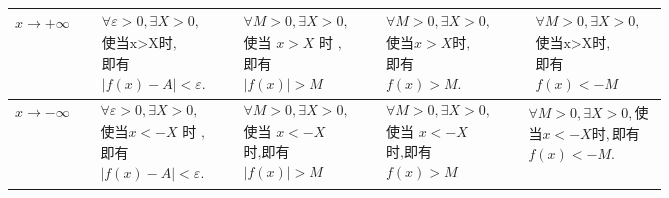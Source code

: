 \documentclass[12pt, a4paper, oneside, UTF8]{ctexbook}  %
\begin{document}
\begin{sloppypar}
\begin{center}
\begin{supertabular}{|c|c|c|c|c|}
            $x \to + \infty $ & $\begin{aligned}&\forall\varepsilon>0,\exists X>0, \\&\text{使当x>X时,} \\&\text{即有} \\&|f(x)-A|<\varepsilon.\end{aligned} $                                   & $\begin{aligned}&\forall M>0,\exists X>0, \\&\text{使当 }x>X\text{ 时 }, \\&\text{即有}\\& |f(x)|>M\end{aligned}$                            & $\begin{aligned}&\forall M>0,\exists X>0,\\&\text{使当}x>X\text{时},\\&\text{即有}\\&f(x)>M.\end{aligned}$                        & $\begin{aligned}&\forall M>0,\exists X>0, \\&\text{使当x>X时,} \\&\text{即有}\\&f(x)<-M\end{aligned}$                                 \\ \hline
            $x \to -\infty$   & $\begin{aligned}&\forall\varepsilon>0,\exists X>0, \\&\text{使当}x<-X\text{ 时 }, \\&\text{即有} \\&|f(x)-A|<\varepsilon.\end{aligned}$                          & $\begin{aligned} & \forall M>0 , \exists X> 0,\\&\text{使当 }x<-X \\&\text{时,即有}\\&|f(x)|>M\end{aligned}$                                 & $\begin{aligned} &\forall M>0,\exists X> 0,\\&\text{使当 }x<-X \\&\text{时,即有}\\&f(x)>M\end{aligned}$                           & $\begin{aligned}&\forall M>0,\exists X>0,\text{使}\\&\text{当}x<-X\text{时},\text{即有}\\&f(x)< -M.\end{aligned}$                     \\ \hline

\end{supertabular}
\end{center}
\end{sloppypar}
\end{document}

